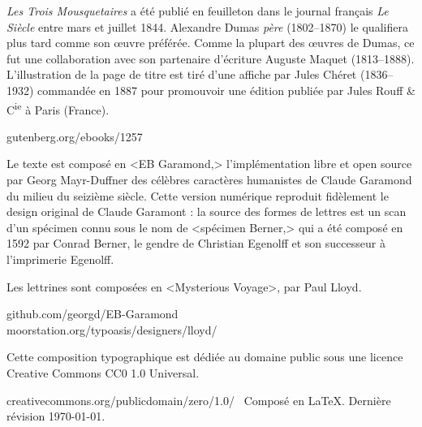 \documentclass[
paper=5.5in:8.5in,
]{scrbook}
\begin{document}
\vfill
\begin{minipage}{\textwidth}
\textit{Les Trois Mousquetaires} a été publié en feuilleton dans le journal français \textit{Le Siècle} entre mars et juillet 1844. Alexandre Dumas \textit{père} (1802--1870) le qualifiera plus tard comme son œuvre préférée. Comme la plupart des œuvres de Dumas, ce fut une collaboration avec son partenaire d'écriture Auguste Maquet (1813--1888).
L'illustration de la page de titre est tiré d'une affiche par Jules Chéret (1836--1932) commandée en 1887 pour promouvoir une édition publiée par Jules Rouff \& C\textsuperscript{ie} à Paris (France).
\end{minipage}
\vfill
gutenberg.org/ebooks/1257
\vfill
\divider
\vfill
\begin{minipage}{\textwidth}
Le texte est composé en <EB Garamond,> l'implémentation libre et open source par Georg Mayr-Duffner des célèbres caractères humanistes de Claude Garamond du milieu du seizième siècle. Cette version numérique reproduit fidèlement le design original de Claude Garamont : la source des formes de lettres est un scan d'un spécimen connu sous le nom de <spécimen Berner,> qui a été composé en 1592 par Conrad Berner, le gendre de Christian Egenolff et son successeur à l'imprimerie Egenolff.

Les lettrines sont composées en <Mysterious Voyage>, par Paul Lloyd.
\end{minipage}
\vfill
github.com/georgd/EB-Garamond\\moorstation.org/typoasis/designers/lloyd/
\vfill
\divider
\vfill
\begin{minipage}{\textwidth}
Cette composition typographique est dédiée au domaine public sous une licence Creative Commons CC0 1.0 Universal. 
\end{minipage}
\vfill
creativecommons.org/publicdomain/zero/1.0/\
\vfill
\divider
\vfill
Composé en \LaTeX{}. Dernière révision \today.
\thispagestyle{empty}
\end{document}

